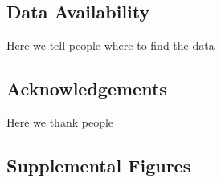 \documentclass[
]{article}
\begin{document}
\subsection{Data Availability}\label{data-availability}

Here we tell people where to find the data

\subsection{Acknowledgements}\label{acknowledgements}

Here we thank people

\pagebreak

\subsection{Supplemental Figures}\label{supplemental-figures}
\end{document}
